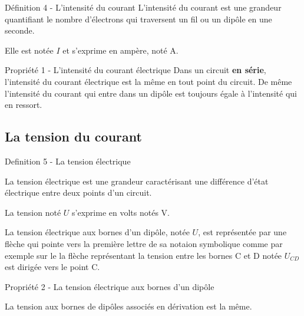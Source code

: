 \documentclass[french, a4paper, 12pt]{article}
\begin{document}
\begin{definition}{Définition 4 - L'intensité du courant}
	L'intensité du courant est une grandeur quantifiant le nombre d'électrons qui traversent un fil ou un dipôle en une seconde.\medskip
	
	Elle est notée $I$ et s'exprime en ampère, noté A.
	
\end{definition}




\begin{Proposition}{Propriété 1 - L'intensité du courant électrique}
	Dans un circuit \textbf{en série}, l'intensité du courant électrique est la même en tout point du circuit. De même l'intensité du courant qui entre dans un dipôle est toujours égale à l'intensité qui en ressort.
\end{Proposition}

\subsection{La tension du courant}


\begin{definition}{Definition 5 - La tension électrique}

 La tension électrique est une grandeur caractérisant une différence d'état électrique entre deux points d'un circuit.\medskip

La tension noté $U$ s'exprime en volts notés V.
	
\end{definition}

La tension électrique aux bornes d'un dipôle, notée $U$, est représentée par une flèche qui pointe vers la première lettre de sa notaion symbolique comme par exemple sur le  la flèche représentant la tension entre les bornes C et D notée $U_{CD}$ est dirigée vers le point C.\medskip



\begin{Proposition}{Propriété 2 - La tension électrique aux bornes d'un dipôle}

	La tension aux bornes de dipôles associés en dérivation est la même.
\end{Proposition}
\end{document}
